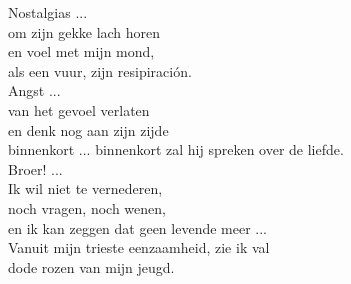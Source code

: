 \begin{translation}
Nostalgias ...\\
om zijn gekke lach horen\\
en voel met mijn mond,\\
als een vuur, zijn resipiración.\\
Angst ...\\
van het gevoel verlaten\\
en denk nog aan zijn zijde\\
binnenkort ... binnenkort zal hij spreken over de liefde.\\
Broer! ...\\
Ik wil niet te vernederen,\\
noch vragen, noch wenen,\\
en ik kan zeggen dat geen levende meer ...\\
Vanuit mijn trieste eenzaamheid, zie ik val\\
dode rozen van mijn jeugd.
\end{translation}